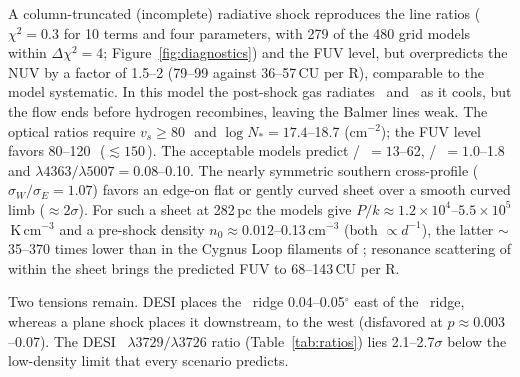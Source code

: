 A column-truncated (incomplete) radiative shock \citep{Raymond1988} reproduces the line ratios ($\chi^2=0.3$ for 10 terms and four parameters, with 279 of the 480 grid models within $\Delta\chi^2=4$; Figure~\ref{fig:diagnostics}) and the FUV level, but overpredicts the NUV by a factor of 1.5--2 (79--99 against 36--57\,CU per R), comparable to the model systematic. In this model the post-shock gas radiates \Oiii\ and \Oii\ as it cools, but the flow ends before hydrogen recombines, leaving the Balmer lines weak. The optical ratios require $v_s\ge80$\,\kms\ and $\log N_*=17.4$--18.7 (cm$^{-2}$); the FUV level favors 80--120\,\kms\ ($\lesssim150$\,\kms). The acceptable models predict \Oiii/\Hb\ $=13$--62, \Oii/\Oiii\ $=1.0$--1.8 and $\lambda4363/\lambda5007=0.08$--0.10. The nearly symmetric southern cross-profile ($\sigma_W/\sigma_E=1.07$) favors an edge-on flat or gently curved sheet over a smooth curved limb ($\approx2\sigma$). For such a sheet at 282\,pc the models give $P/k\approx1.2\times10^4$--$5.5\times10^5$\,K\,cm$^{-3}$ and a pre-shock density $n_0\approx0.012$--0.13\,cm$^{-3}$ (both $\propto d^{-1}$), the latter $\sim$35--370 times lower than in the Cygnus Loop filaments of \citet{Raymond1988}; resonance scattering of  within the sheet brings the predicted FUV to 68--143\,CU per R.

Two tensions remain. DESI places the \Oii\ ridge 0.04--0.05$^{\circ}$ east of the \Oiii\ ridge, whereas a plane shock places it downstream, to the west (disfavored at $p\approx0.003$--0.07). The DESI \Oii~$\lambda3729/\lambda3726$ ratio (Table~\ref{tab:ratios}) lies 2.1--2.7$\sigma$ below the low-density limit that every scenario predicts.

